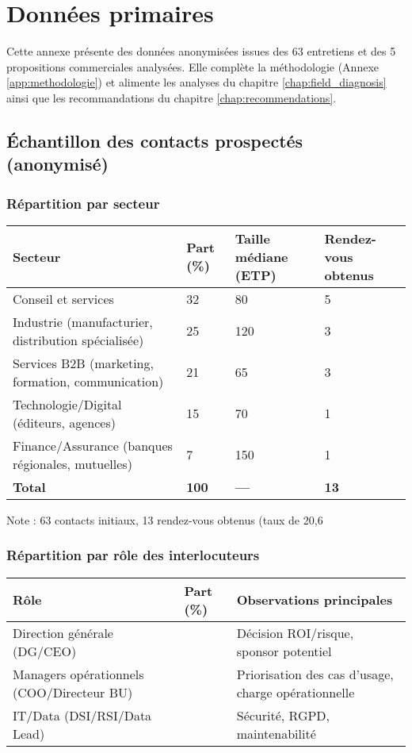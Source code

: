 \chapter{Données primaires}
\label{app:data}

Cette annexe présente des données anonymisées issues des 63 entretiens et des 5 propositions commerciales analysées. Elle complète la méthodologie (Annexe \ref{app:methodologie}) et alimente les analyses du chapitre \ref{chap:field_diagnosis} ainsi que les recommandations du chapitre \ref{chap:recommendations}.

\section{Échantillon des contacts prospectés (anonymisé)}
\subsection{Répartition par secteur}
\begin{longtable}{@{}p{6cm}p{3cm}p{3cm}p{3cm}@{}}
\toprule
\textbf{Secteur} & \textbf{Part (\%)} & \textbf{Taille médiane (ETP)} & \textbf{Rendez-vous obtenus} \\
\midrule
Conseil et services & 32 & 80 & 5 \\
Industrie (manufacturier, distribution spécialisée) & 25 & 120 & 3 \\
Services B2B (marketing, formation, communication) & 21 & 65 & 3 \\
Technologie/Digital (éditeurs, agences) & 15 & 70 & 1 \\
Finance/Assurance (banques régionales, mutuelles) & 7 & 150 & 1 \\
\midrule
\textbf{Total} & \textbf{100} & \textbf{—} & \textbf{13} \\
\bottomrule
\end{longtable}
Note : 63 contacts initiaux, 13 rendez-vous obtenus (taux de 20,6 %

\subsection{Répartition par rôle des interlocuteurs}
\begin{longtable}{@{}>{\raggedright\arraybackslash}p{6cm}>{\raggedright\arraybackslash}p{2.5cm}>{\raggedright\arraybackslash}p{5cm}@{}}
\toprule
\textbf{Rôle} & \textbf{Part (\%)} & \textbf{Observations principales} \\
\midrule
Direction générale (DG/CEO) & 38 & Décision ROI/risque, sponsor potentiel \\
Managers opérationnels (COO/Directeur BU) & 34 & Priorisation des cas d’usage, charge opérationnelle \\
IT/Data (DSI/RSI/Data Lead) & 28 & Sécurité, RGPD, maintenabilité \\
\bottomrule
\end{longtable}

